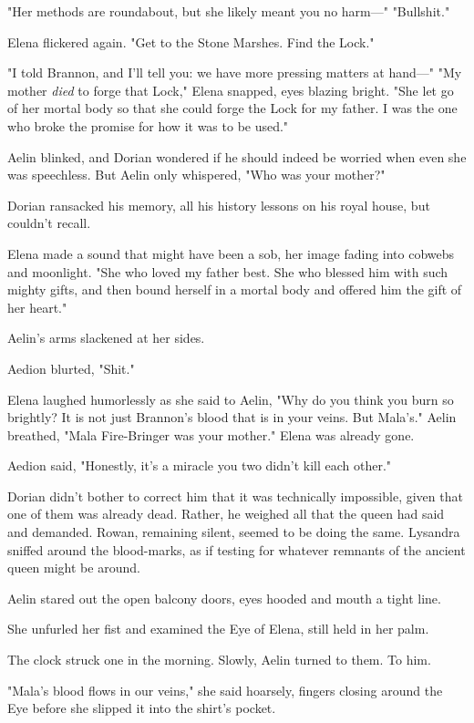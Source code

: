 "Her methods are roundabout, but she likely meant you no harm---" "Bullshit."

Elena flickered again.
"Get to the Stone Marshes.
Find the Lock."

"I told Brannon, and I'll tell you: we have more pressing matters at hand---" "My mother \emph{died} to forge that Lock," Elena snapped, eyes blazing bright.
"She let go of her mortal body so that she could forge the Lock for my father.
I was the one who broke the promise for how it was to be used."

Aelin blinked, and Dorian wondered if he should indeed be worried when even she was speechless.
But Aelin only whispered, "Who was your mother?"

Dorian ransacked his memory, all his history lessons on his royal house, but couldn't recall.

Elena made a sound that might have been a sob, her image fading into cobwebs and moonlight.
"She who loved my father best.
She who blessed him with such mighty gifts, and then bound herself in a mortal body and offered him the gift of her heart."

Aelin's arms slackened at her sides.

Aedion blurted, "Shit."

Elena laughed humorlessly as she said to Aelin, "Why do you think you burn so brightly?
It is not just Brannon's blood that is in your veins.
But Mala's."
Aelin breathed, "Mala Fire-Bringer was your mother."
Elena was already gone.

Aedion said, "Honestly, it's a miracle you two didn't kill each other."

Dorian didn't bother to correct him that it was technically impossible, given that one of them was already dead.
Rather, he weighed all that the queen had said and demanded.
Rowan, remaining silent, seemed to be doing the same.
Lysandra sniffed around the blood-marks, as if testing for whatever remnants of the ancient queen might be around.

Aelin stared out the open balcony doors, eyes hooded and mouth a tight line.

She unfurled her fist and examined the Eye of Elena, still held in her palm.

The clock struck one in the morning.
Slowly, Aelin turned to them.
To him.

"Mala's blood flows in our veins," she said hoarsely, fingers closing around the Eye before she slipped it into the shirt's pocket.

